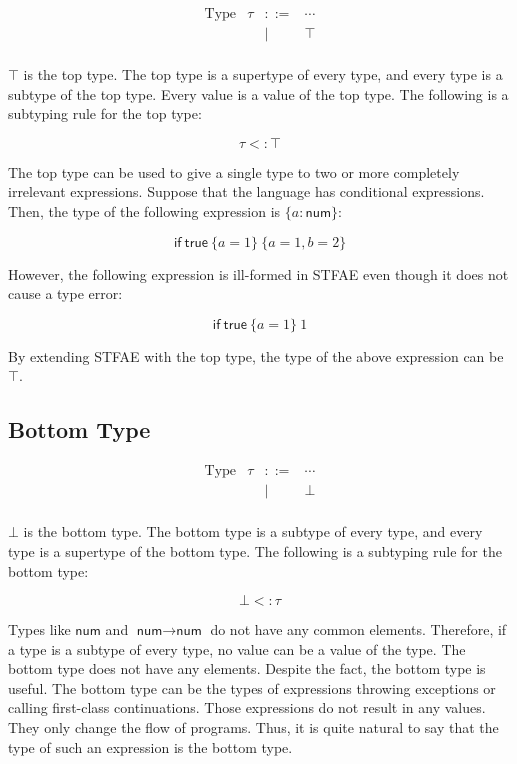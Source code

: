 \[
\begin{array}{rrcl}
\text{Type} & \tau & ::= & \cdots \\
&&|& \top \\
\end{array}
\]

$\top$ is the top type. The top type is a supertype of every type, and every
type is a subtype of the top type. Every value is a value of the top type. The
following is a subtyping rule for the top type:

\[\tau<:\top\]

The top type can be used to give a single type to two or more completely
irrelevant expressions. Suppose that the language has conditional expressions.
Then, the type of the following expression is $\{a:\textsf{num}\}$:

\[\textsf{if}\ \textsf{true}\ \{a=1\}\ \{a=1,b=2\}\]

However, the following expression is ill-formed in STFAE even though it does not
cause a type error:

\[\textsf{if}\ \textsf{true}\ \{a=1\}\ 1\]

By extending STFAE with the top type, the type of the above expression can be
$\top$.

\subsection{Bottom Type}

\[
\begin{array}{rrcl}
\text{Type} & \tau & ::= & \cdots \\
&&|& \bot \\
\end{array}
\]

$\bot$ is the bottom type. The bottom type is a subtype of every type, and
every type is a supertype of the bottom type. The following is a subtyping rule
for the bottom type:

\[\bot<:\tau\]

Types like $\textsf{num}$ and $\textsf{num}\rightarrow\textsf{num}$ do not have any
common elements. Therefore, if a type is a subtype of every type, no value can
be a value of the type. The bottom type does not have any elements. Despite
the fact, the bottom type is useful. The bottom type can be the types of
expressions throwing exceptions or calling first-class continuations. Those
expressions do not result in any values. They only change the flow of
programs. Thus, it is quite natural to say that the type of such an expression
is the bottom type.
